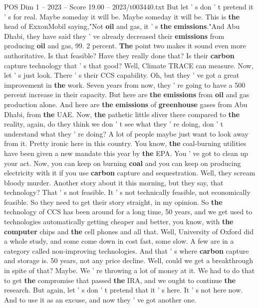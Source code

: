 \begin{textsample}{POS Dim 1 – 2023 – Score 19.00 – 2023/t003440.txt}
But let ' s don ' t pretend it ' s for real.
Maybe someday it will be.
Maybe someday it will be.
This is \textbf{the} head of ExxonMobil saying,"Not \textbf{oil} and gas, it ' s \textbf{the} \textbf{emissions}."And Abu Dhabi, they have said they ' ve already decreased their \textbf{emissions} from producing \textbf{oil} and gas, 99. 2 percent. \textbf{The} point two makes it sound even more authoritative.
Is that feasible?
Have they really done that?
Is their \textbf{carbon} capture technology that ' s that good?
Well, Climate TRACE can measure.
Now, let ' s just look.
There ' s their CCS capability.
Oh, but they ' ve got a great improvement in \textbf{the} work.
Seven years from now, they ' re going to have a 500 percent increase in their capacity.
But here are \textbf{the} \textbf{emissions} from \textbf{oil} and gas production alone.
And here are \textbf{the} \textbf{emissions} of \textbf{greenhouse} gases from Abu Dhabi, from \textbf{the} UAE.
Now, \textbf{the} pathetic little sliver there compared to \textbf{the} reality, again, do they think we don ' t see what they ' re doing, don ' t understand what they ' re doing?
A lot of people maybe just want to look away from it.
Pretty ironic here in this country.
You know, \textbf{the} coal-burning utilities have been given a new mandate this year by \textbf{the} EPA.
You ' ve got to clean up your act.
Now, you can keep on burning \textbf{coal} and you can keep on producing electricity with it if you use \textbf{carbon} capture and sequestration.
Well, they scream bloody murder.
Another story about it this morning, but they say, that technology?
That ' s not feasible.
It ' s not technically feasible, not economically feasible.
So they need to get their story straight, in my opinion.
So \textbf{the} technology of CCS has been around for a long time, 50 years, and we get used to technologies automatically getting cheaper and better, you know, with \textbf{the} \textbf{computer} chips and \textbf{the} cell phones and all that.
Well, University of Oxford did a whole study, and some come down in cost fast, some slow.
A few are in a category called non-improving technologies.
And that ' s where \textbf{carbon} capture and storage is. 50 years, not any price decline.
Well, could we get a breakthrough in spite of that?
Maybe.
We ' re throwing a lot of money at it.
We had to do that to get \textbf{the} compromise that passed \textbf{the} IRA, and we ought to continue \textbf{the} research.
But again, let ' s don ' t pretend that it ' s here.
It ' s not here now.
And to use it as an excuse, and now they ' ve got another one.

\end{textsample}
